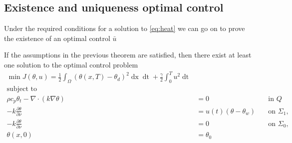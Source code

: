 \subsection{Existence and uniqueness optimal control}
Under the required conditions for a solution to \eqref{eq:heat} we can go on to prove the existence of an optimal control $\bar{u}$
\begin{theorem}
If the assumptions in the previous theorem are satisfied, then there exist at least one solution to the optimal control problem 
\begin{align*}
       \min J(\theta, u) = \frac{1}{2} \int_\Omega (\theta(x, T) - \theta_d)^2 \mathop{dx} \mathop{dt} + \frac{\gamma}{2} \int_0^{T} u^2 \mathop{dt} \\
       \text{subject to} \\
       \rho c_p \theta_t - \nabla \cdot (k \nabla \theta) &= 0 \quad &\text{in } Q  \\
      -k \frac{\partial \theta}{\partial \nu} &= u(t) (\theta - \theta_w) \quad &\text{on } \Sigma_1, \\
      -k \frac{\partial \theta}{\partial \nu} &= 0 \quad &\text{on } \Sigma_0, \\
      \theta(x, 0) &= \theta_0 &
\end{align*}
\end{theorem}

